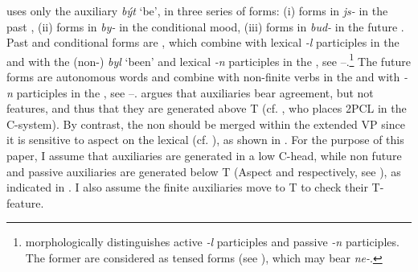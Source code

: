 \documentclass[output=paper,colorlinks,citecolor=brown,]{langsci/langscibook}
\begin{document}
 uses only the auxiliary  \textit{být} `be', in three series of forms: (i) forms in \textit{js-} in the past , (ii) forms in \textit{by-} in the conditional mood, (iii) forms in \textit{bud-} in the future . Past and conditional forms are , which combine with lexical \textit{-l} participles in the  and with the (non-)  \textit{byl} `been' and lexical \textit{-n} participles in the , see --.\footnote{ morphologically distinguishes active \textit{-l} participles and passive \textit{-n} participles. The former are considered as tensed forms (see \citealt{Veselovská1995,Veselovská2008}), which may bear  \textit{ne-}.} The future forms are autonomous words and combine with non-finite  verbs in the  and with \textit{-n} participles in the , see --. \cite{Veselovská1995,Veselovská2008} argues that   auxiliaries bear agreement, but not  features, and thus that they are generated above T (cf. \citealt{Roberts2010}, who places  2PCL in the C-system). By contrast, the non   should be merged within the extended VP since it is sensitive to aspect on the lexical  (cf. \citealt{Kyncl2008}), as shown in . For the purpose of this paper, I assume that  auxiliaries are generated in a low C-head, while non  future and passive auxiliaries are generated below T (Aspect and  respectively, see \citealt{Cinque2004}), as indicated in . I also assume the finite auxiliaries move to T to check their T-feature.
\end{document}
